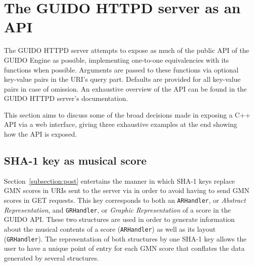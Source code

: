 \documentclass[11pt,a4paper]{article}
\begin{document}

\section{The GUIDO HTTPD server as an API}\label{section:guido-api}
The GUIDO HTTPD server attempts to expose as much of the public API of the GUIDO Engine as possible, implementing one-to-one equivalencies with its functions when possible.  Arguments are passed to these functions via optional key-value pairs in the URI's query part.  Defaults are provided for all key-value pairs in case of omission.  An exhaustive overview of the API can be found in the GUIDO HTTPD server's documentation\cite{guidoweb0.50}.\par
This section aims to discuss some of the broad decisions made in exposing a C++ API via a web interface, giving three exhaustive examples at the end showing how the API is exposed.

\subsection{SHA-1 key as musical score}
Section~\ref{subsection:post} entertains the manner in which SHA-1 keys replace GMN scores in URIs sent to the server via in order to avoid having to send GMN scores in GET requests. This key corresponds to both an \verb=ARHandler=, or \emph{Abstract Representation}, and \verb=GRHandler=, or \emph{Graphic Representation} of a score in the GUIDO API.  These two structures are used in order to generate information about the musical contents of a score (\verb=ARHandler=) as well as its layout (\verb=GRHandler=). The representation of both structures by one SHA-1 key allows the user to have a unique point of entry for each GMN score that conflates the data generated by several structures.
\end{document}
